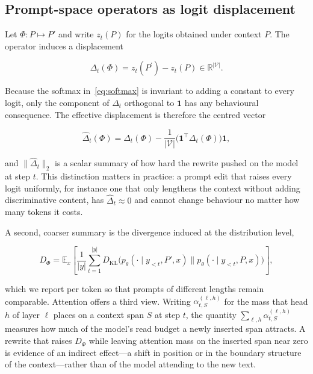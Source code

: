 \documentclass[conference]{IEEEtran}
\begin{document}
\subsection{Prompt-space operators as logit displacement}
\label{sec:prompt-operators}

Let $\Phi : P \mapsto P'$ and write $z_t(P)$ for the logits obtained under context $P$. The operator induces a displacement

\begin{equation}
\Delta_{t}(\Phi) = z_{t}(P^{\prime}) - z_{t}(P) \in \mathbb{R}^{|\mathcal{V}|}.
\label{eq:delta}
\end{equation}

Because the softmax in~\eqref{eq:softmax} is invariant to adding a constant to every logit, only the component of $\Delta_{t}$ orthogonal to $\mathbf{1}$ has any behavioural consequence. The effective displacement is therefore the centred vector

\begin{equation}
\hat{\Delta}_{t}(\Phi) = \Delta_{t}(\Phi) - \frac{1}{|\mathcal{V}|}\big(\mathbf{1}^{\top}\Delta_{t}(\Phi)\big)\mathbf{1},
\label{eq:centred-delta}
\end{equation}

and $\|\hat{\Delta}_{t}\|_{2}$ is a scalar summary of how hard the rewrite pushed on the model at step $t$. This distinction matters in practice: a prompt edit that raises every logit uniformly, for instance one that only lengthens the context without adding discriminative content, has $\hat{\Delta}_{t} \approx 0$ and cannot change behaviour no matter how many tokens it costs.

A second, coarser summary is the divergence induced at the distribution level,

\begin{equation}
D_{\Phi} = \mathbb{E}_{x}\left[ \frac{1}{|y|} \sum_{t=1}^{|y|} D_{\mathrm{KL}}\big(p_{\theta}(\cdot \mid y_{<t}, P', x) \| p_{\theta}(\cdot \mid y_{<t}, P, x)\big) \right],
\label{eq:divergence}
\end{equation}

which we report per token so that prompts of different lengths remain comparable. Attention offers a third view. Writing $\alpha_{t,S}^{(\ell,h)}$ for the mass that head $h$ of layer $\ell$ places on a context span $S$ at step $t$, the quantity $\sum_{\ell,h}\alpha_{t,S}^{(\ell,h)}$ measures how much of the model's read budget a newly inserted span attracts. A rewrite that raises $D_{\Phi}$ while leaving attention mass on the inserted span near zero is evidence of an indirect effect---a shift in position or in the boundary structure of the context---rather than of the model attending to the new text.
\end{document}
